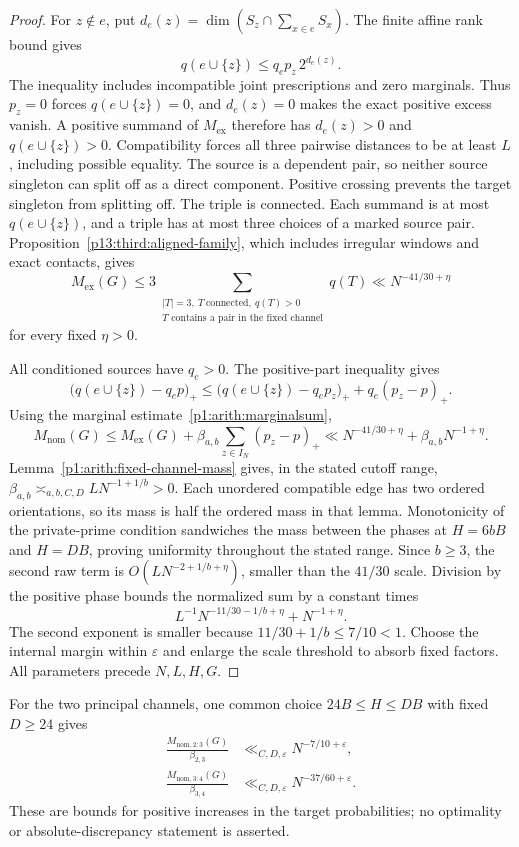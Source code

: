 \begin{proof}
For $z\notin e$, put
$d_e(z)=\dim(S_z\cap\sum_{x\in e}S_x)$.
The finite affine rank bound gives
\[
 q(e\cup\{z\})\le q_ep_z\,2^{d_e(z)}.
\]
The inequality includes incompatible joint prescriptions and zero
marginals. Thus $p_z=0$ forces $q(e\cup\{z\})=0$, and $d_e(z)=0$
makes the exact positive excess vanish.
A positive summand of $M_{\mathrm{ex}}$ therefore has
$d_e(z)>0$ and $q(e\cup\{z\})>0$.
Compatibility forces all three pairwise distances to be at least $L$,
including possible equality. The source is a dependent pair, so neither
source singleton can split off as a direct component. Positive crossing
prevents the target singleton from splitting off. The triple is connected.
Each summand is at most $q(e\cup\{z\})$, and a triple has at most three
choices of a marked source pair. Proposition~\ref{p13:third:aligned-family},
which includes irregular windows and exact contacts, gives
\[
 M_{\mathrm{ex}}(G)
 \le3\sum_{\substack{|T|=3,\ T\ \mathrm{connected},\ q(T)>0\\
              T\text{ contains a pair in the fixed channel}}}q(T)
 \ll N^{-41/30+\eta}
\]
for every fixed $\eta>0$.

All conditioned sources have $q_e>0$. The positive-part inequality gives
\[
 \bigl(q(e\cup\{z\})-q_ep\bigr)_+
 \le\bigl(q(e\cup\{z\})-q_ep_z\bigr)_+
      +q_e(p_z-p)_+.
\]
Using the marginal estimate~\eqref{p1:arith:marginalsum},
\[
 M_{\mathrm{nom}}(G)
 \le M_{\mathrm{ex}}(G)+\beta_{a,b}\sum_{z\in I_N}(p_z-p)_+
 \ll N^{-41/30+\eta}+\beta_{a,b}N^{-1+\eta}.
\]
Lemma~\ref{p1:arith:fixed-channel-mass} gives, in the stated cutoff range,
$\beta_{a,b}\asymp_{a,b,C,D}LN^{-1+1/b}>0$.
Each unordered compatible edge has two ordered orientations, so its
mass is half the ordered mass in that lemma. Monotonicity of the
private-prime condition sandwiches the mass between the phases at
$H=6bB$ and $H=DB$, proving uniformity throughout the stated range.
Since $b\ge3$, the second raw term is
$O(LN^{-2+1/b+\eta})$, smaller than the $41/30$ scale.
Division by the positive phase bounds the normalized sum by a constant
times
\[
 L^{-1}N^{-11/30-1/b+\eta}+N^{-1+\eta}.
\]
The second exponent is smaller because $11/30+1/b\le7/10<1$.
Choose the internal margin within $\varepsilon$ and enlarge the scale
threshold to absorb fixed factors. All parameters precede $N,L,H,G$.
\end{proof}

For the two principal channels, one common choice $24B\le H\le DB$
with fixed $D\ge24$ gives
\begin{align}
 \frac{M_{\mathrm{nom},2:3}(G)}{\beta_{2,3}}
     &\ll_{C,D,\varepsilon}N^{-7/10+\varepsilon},
     \label{p1:arith:palm23}\\
 \frac{M_{\mathrm{nom},3:4}(G)}{\beta_{3,4}}
     &\ll_{C,D,\varepsilon}N^{-37/60+\varepsilon}.
     \label{p1:arith:palm34}
\end{align}
These are bounds for positive increases in the target probabilities;
no optimality or absolute-discrepancy statement is asserted.
